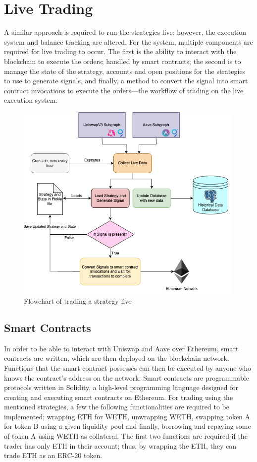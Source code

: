 \section{Live Trading}
A similar approach is required to run the strategies live; however, the execution system and balance tracking are altered. For the system, multiple components are required for live trading to occur. The first is the ability to interact with the blockchain to execute the orders; handled by smart contracts; the second is to manage the state of the strategy, accounts and open positions for the strategies to use to generate signals, and finally, a method to convert the signal into smart contract invocations to execute the orders—the workflow of trading on the live execution system.
\begin{figure}[H]
    \centering
    \includegraphics[width=0.99\textwidth]{project/Images/live-trading-system-diagram.png}
    \caption{Flowchart of trading a strategy live \label{fig:live-flow}}
\end{figure}

\subsection{Smart Contracts}
\label{sec:smart-contracts}
In order to be able to interact with Uniswap and Aave over Ethereum, smart contracts are written, which are then deployed on the blockchain network. Functions that the smart contract possesses can then be executed by anyone who knows the contract's address on the network. Smart contracts are programmable protocols written in Solidity, a high-level programming language designed for creating and executing smart contracts on Ethereum. For trading using the mentioned strategies, a few the following functionalities are required to be implemented; wrapping ETH for WETH, unwrapping WETH, swapping token A for token B using a given liquidity pool and finally, borrowing and repaying some of token A using WETH as collateral. The first two functions are required if the trader has only ETH in their account; thus, by wrapping the ETH, they can trade ETH as an ERC-20 token.

